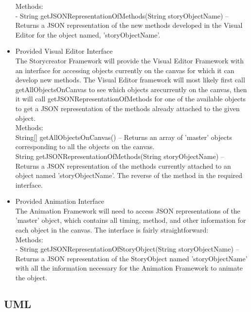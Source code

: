\documentclass[12pt]{article}
\begin{document}
\begin{itemize}
	Methods: \\
	\indent - String getJSONRepresentationOfMethods(String storyObjectName) -- Returns a JSON representation of the new methods developed in the Visual Editor for the object named, 'storyObjectName'. \\
	
	\item Provided Visual Editor Interface \\
	The Storycreator Framework will provide the Visual Editor Framework with an interface for accessing objects currently on the canvas for which it can develop new methods. The Visual Editor framework will most likely first call getAllObjectsOnCanvas to see which objects arecurrently on the canvas, then it will call getJSONRepresentationOfMethods for one of the available objects to get a JSON representation of the methods already attached to the given object.  \\
	
	Methods: \\
	\indent String[] getAllObjectsOnCanvas() -- Returns an array of 'master' objects corresponding to all the objects on the canvas. \\
	
	\indent 	 String getJSONRepresentationOfMethods(String storyObjectName) -- Returns a JSON representation of the methods currently attached to an object named 'storyObjectName'. The reverse of the method in the required interface. \\
	
	\item Provided Animation Interface \\
	The Animation Framework will need to access JSON representations of the 'master' object, which contains all timing, method, and other information for each object in the canvas. The interface is fairly straightforward: \\
	
	Methods: \\
	\indent - String getJSONRepresentationOfStoryObject(String storyObjectName) -- Returns a JSON representation of the StoryObject named 'storyObjectName' with all the information necessary for the Animation Framework to animate the object. \\
	
\end{itemize}
\subsection{UML}
\end{document}
